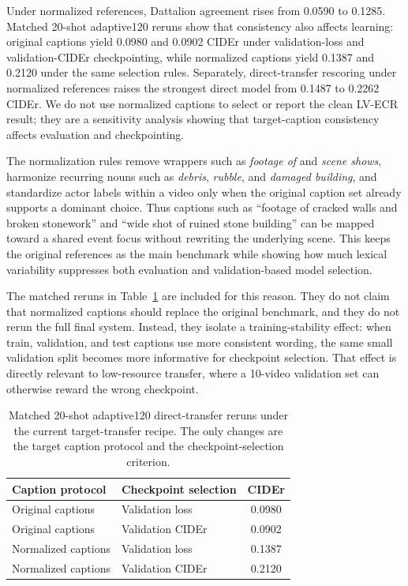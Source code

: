 \documentclass[pdflatex,sn-mathphys-num]{sn-jnl}
\theoremstyle{thmstyleone}
\theoremstyle{thmstyletwo}
\theoremstyle{thmstylethree}
\begin{document}
Under normalized references, Dattalion agreement rises from 0.0590 to 0.1285. Matched 20-shot adaptive120 reruns show that consistency also affects learning: original captions yield 0.0980 and 0.0902 CIDEr under validation-loss and validation-CIDEr checkpointing, while normalized captions yield 0.1387 and 0.2120 under the same selection rules. Separately, direct-transfer rescoring under normalized references raises the strongest direct model from 0.1487 to 0.2262 CIDEr. We do not use normalized captions to select or report the clean LV-ECR result; they are a sensitivity analysis showing that target-caption consistency affects evaluation and checkpointing.

The normalization rules remove wrappers such as \textit{footage of} and \textit{scene shows}, harmonize recurring nouns such as \textit{debris}, \textit{rubble}, and \textit{damaged building}, and standardize actor labels within a video only when the original caption set already supports a dominant choice. Thus captions such as ``footage of cracked walls and broken stonework'' and ``wide shot of ruined stone building'' can be mapped toward a shared event focus without rewriting the underlying scene. This keeps the original references as the main benchmark while showing how much lexical variability suppresses both evaluation and validation-based model selection.

The matched reruns in Table~\ref{tab:normalized_20shot_deconfound} are included for this reason. They do not claim that normalized captions should replace the original benchmark, and they do not rerun the full final system. Instead, they isolate a training-stability effect: when train, validation, and test captions use more consistent wording, the same small validation split becomes more informative for checkpoint selection. That effect is directly relevant to low-resource transfer, where a 10-video validation set can otherwise reward the wrong checkpoint.

\begin{table}[htbp]
    \centering
    \small
    \begin{tabular}{llc}
        \toprule
        \textbf{Caption protocol} & \textbf{Checkpoint selection} & \textbf{CIDEr} \\
        \midrule
        Original captions & Validation loss & 0.0980 \\
        Original captions & Validation CIDEr & 0.0902 \\
        Normalized captions & Validation loss & 0.1387 \\
        Normalized captions & Validation CIDEr & 0.2120 \\
        \bottomrule
    \end{tabular}
    \caption{Matched 20-shot adaptive120 direct-transfer reruns under the current target-transfer recipe. The only changes are the target caption protocol and the checkpoint-selection criterion.}
    \label{tab:normalized_20shot_deconfound}
\end{table}
\end{document}
